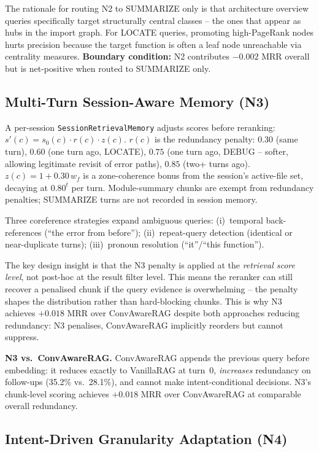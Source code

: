 \documentclass[runningheads]{llncs}
\begin{document}
The rationale for routing N2 to SUMMARIZE only is that architecture
overview queries specifically target structurally central classes -- the
ones that appear as hubs in the import graph. For LOCATE queries,
promoting high-PageRank nodes hurts precision because the target function
is often a leaf node unreachable via centrality measures.
\textbf{Boundary condition:} N2 contributes
$-0.002$ MRR overall but is net-positive when routed to SUMMARIZE only.

\subsection{Multi-Turn Session-Aware Memory (N3)}

A per-session \texttt{SessionRetrievalMemory} adjusts scores before reranking:
$s'(c) = s_0(c)\cdot r(c)\cdot z(c)$.
$r(c)$ is the redundancy penalty: $0.30$ (same turn), $0.60$ (one turn ago,
LOCATE), $0.75$ (one turn ago, DEBUG -- softer, allowing legitimate revisit
of error paths), $0.85$ (two+ turns ago). $z(c) = 1 + 0.30\,w_f$ is a
zone-coherence bonus from the session's active-file set, decaying at $0.80^t$
per turn. Module-summary chunks are exempt from redundancy penalties;
SUMMARIZE turns are not recorded in session memory.

Three coreference strategies expand ambiguous queries:
(i)~temporal back-references (``the error from before'');
(ii)~repeat-query detection (identical or near-duplicate turns);
(iii)~pronoun resolution (``it''/``this function'').

The key design insight is that the N3 penalty is applied at the
\emph{retrieval score level}, not post-hoc at the result filter level.
This means the reranker can still recover a penalised chunk if the query
evidence is overwhelming -- the penalty shapes the distribution rather than
hard-blocking chunks. This is why N3 achieves $+0.018$ MRR over ConvAwareRAG
despite both approaches reducing redundancy: N3 penalises, ConvAwareRAG
implicitly reorders but cannot suppress.

\textbf{N3 vs.\ ConvAwareRAG.} ConvAwareRAG appends the previous query
before embedding: it reduces exactly to VanillaRAG at turn~0, \emph{increases}
redundancy on follow-ups (35.2\% vs.\ 28.1\%), and cannot make
intent-conditional decisions. N3's chunk-level scoring achieves $+0.018$
MRR over ConvAwareRAG at comparable overall redundancy.

\subsection{Intent-Driven Granularity Adaptation (N4)}
\end{document}
